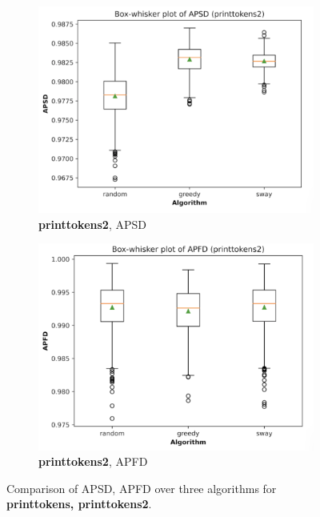 \documentclass[10pt,journal,compsoc]{IEEEtran}
\begin{document}
\begin{figure}
		\begin{subfigure}[b]{0.4\linewidth}
			\centering
			\includegraphics[width=\textwidth]{figures/APSD_printtokens2.png}
			\caption{{\bf printtokens2}, APSD}
		\end{subfigure}
		\hfill
		\begin{subfigure}[b]{0.4\linewidth}
			\centering
			\includegraphics[width=\textwidth]{figures/APFD_printtokens2.png}
			\caption{{\bf printtokens2}, APFD}
		\end{subfigure}
		
		\caption{Comparison of APSD, APFD over three algorithms for {\bf printtokens, printtokens2}.}
		\label{fig:main2}
	\end{figure}
	
\end{document}
